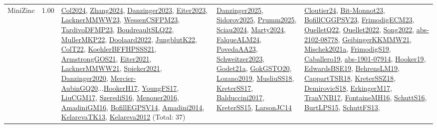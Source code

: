 {\begin{longtable}{p{3cm}r>{\raggedright\arraybackslash}p{6cm}>{\raggedright\arraybackslash}p{6cm}>{\raggedright\arraybackslash}p{8cm}}
\index{MiniZinc}\index{CPSystems!MiniZinc}MiniZinc &  1.00 & \hyperref[detail:Col2024]{Col2024}, \hyperref[detail:Zhang2024]{Zhang2024}, \hyperref[detail:Danzinger2023]{Danzinger2023}, \hyperref[detail:Eiter2023]{Eiter2023}, \hyperref[detail:LacknerMMWW23]{LacknerMMWW23}, \hyperref[detail:WessenCSFPM23]{WessenCSFPM23}, \hyperref[detail:TardivoDFMP23]{TardivoDFMP23}, \hyperref[detail:BoudreaultSLQ22]{BoudreaultSLQ22}, \hyperref[detail:MullerMKP22]{MullerMKP22}, \hyperref[detail:Doolaard2022]{Doolaard2022}, \hyperref[detail:JungblutK22]{JungblutK22}, \hyperref[detail:ColT22]{ColT22}, \hyperref[detail:KoehlerBFFHPSSS21]{KoehlerBFFHPSSS21}, \hyperref[detail:ArmstrongGOS21]{ArmstrongGOS21}, \hyperref[detail:Eiter2021]{Eiter2021}, \hyperref[detail:LacknerMMWW21]{LacknerMMWW21}, \hyperref[detail:Spieker2021]{Spieker2021}, \hyperref[detail:Danzinger2020]{Danzinger2020}, \hyperref[detail:Mercier-AubinGQ20]{Mercier-AubinGQ20}...\hyperref[detail:HookerH17]{HookerH17}, \hyperref[detail:YoungFS17]{YoungFS17}, \hyperref[detail:LiuCGM17]{LiuCGM17}, \hyperref[detail:SzerediS16]{SzerediS16}, \hyperref[detail:Menouer2016]{Menouer2016}, \hyperref[detail:AmadiniGM16]{AmadiniGM16}, \hyperref[detail:BofillEGPSV14]{BofillEGPSV14}, \hyperref[detail:Amadini2014]{Amadini2014}, \hyperref[detail:KelarevaTK13]{KelarevaTK13}, \hyperref[detail:Kelareva2012]{Kelareva2012} (Total: 37) & \hyperref[detail:Danzinger2025]{Danzinger2025}, \hyperref[detail:Sidorov2025]{Sidorov2025}, \hyperref[detail:Prumm2025]{Prumm2025}, \hyperref[detail:Sciau2024]{Sciau2024}, \hyperref[detail:Marty2024]{Marty2024}, \hyperref[detail:FalqueALM24]{FalqueALM24}, \hyperref[detail:PovedaAA23]{PovedaAA23}, \hyperref[detail:Schweitzer2023]{Schweitzer2023}, \hyperref[detail:Godet21a]{Godet21a}, \hyperref[detail:GokGSTO20]{GokGSTO20}, \hyperref[detail:Lozano2019]{Lozano2019}, \hyperref[detail:MusliuSS18]{MusliuSS18}, \hyperref[detail:KreterSS17]{KreterSS17}, \hyperref[detail:Balduccini2017]{Balduccini2017}, \hyperref[detail:KreterSS15]{KreterSS15}, \hyperref[detail:LarsonJC14]{LarsonJC14} & \hyperref[detail:Cloutier24]{Cloutier24}, \hyperref[detail:Bit-Monnot23]{Bit-Monnot23}, \hyperref[detail:BofillCGGPSV23]{BofillCGGPSV23}, \hyperref[detail:FrimodigECM23]{FrimodigECM23}, \hyperref[detail:OuelletQ22]{OuelletQ22}, \hyperref[detail:Ouellet2022]{Ouellet2022}, \hyperref[detail:Song2022]{Song2022}, \hyperref[detail:abs-2102-08778]{abs-2102-08778}, \hyperref[detail:GeibingerKKMMW21]{GeibingerKKMMW21}, \hyperref[detail:Mischek2021a]{Mischek2021a}, \hyperref[detail:FrimodigS19]{FrimodigS19}, \hyperref[detail:Caballero19]{Caballero19}, \hyperref[detail:abs-1901-07914]{abs-1901-07914}, \hyperref[detail:Hooker19]{Hooker19}, \hyperref[detail:EdwardsBSE19]{EdwardsBSE19}, \hyperref[detail:BehrensLM19]{BehrensLM19}, \hyperref[detail:CappartTSR18]{CappartTSR18}, \hyperref[detail:KreterSSZ18]{KreterSSZ18}, \hyperref[detail:DemirovicS18]{DemirovicS18}, \hyperref[detail:ErkingerM17]{ErkingerM17}, \hyperref[detail:TranVNB17]{TranVNB17}, \hyperref[detail:FontaineMH16]{FontaineMH16}, \hyperref[detail:SchuttS16]{SchuttS16}, \hyperref[detail:BurtLPS15]{BurtLPS15}, \hyperref[detail:SchuttFS13]{SchuttFS13}, 
\end{longtable}}
